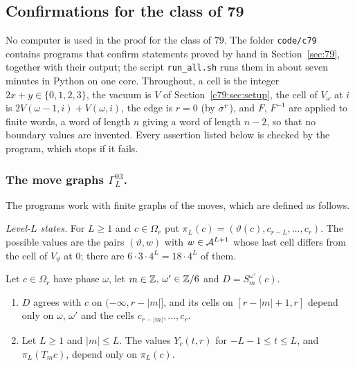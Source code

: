 \subsection{Confirmations for the class of 79}\label{app:79}

No computer is used in the proof for the class of $79$. The folder \texttt{code/c79} contains programs that confirm statements proved by hand in Section~\ref{sec:79}, together with their output; the script \texttt{run\_all.sh} runs them in about seven minutes in Python on one core. Throughout, a cell is the integer $2x+y\in\{0,1,2,3\}$, the vacuum is $V$ of Section~\ref{c79:sec:setup}, the cell of $V_\omega$ at $i$ is $2V(\omega-1,i)+V(\omega,i)$, the edge is $r=0$ (by $\sigma^r$), and $F$, $F^{-1}$ are applied to finite words, a word of length $n$ giving a word of length $n-2$, so that no boundary values are invented. Every assertion listed below is checked by the program, which stops if it fails.

\subsubsection{The move graphs $\Gamma^{93}_L$.}\label{app:79:graphs}
The programs work with finite graphs of the moves, which are defined as follows.

\emph{Level-$L$ states.} For $L\ge1$ and $c\in\Omega_r$ put $\pi_L(c)=(\vartheta(c),c_{r-L},\dots,c_r)$. The possible values are the pairs $(\vartheta,w)$ with $w\in\mathcal{A}^{L+1}$ whose last cell differs from the cell of $V_\vartheta$ at $0$; there are $6\cdot3\cdot4^{L}=18\cdot4^{L}$ of them.

\begin{lemma}[window]\label{c79:lem:window}
Let $c\in\Omega_r$ have phase $\omega$, let $m\in\mathbb{Z}$, $\omega'\in\mathbb{Z}/6$ and $D=S^{\omega'}_m(c)$.
\begin{enumerate}
\item[(a)] $D$ agrees with $c$ on $(-\infty,r-|m|]$, and its cells on $[r-|m|+1,r]$ depend only on $\omega$, $\omega'$ and the cells $c_{r-|m|},\dots,c_r$.
\item[(b)] Let $L\ge1$ and $|m|\le L$. The values $Y_c(t,r)$ for $-L-1\le t\le L$, and $\pi_L(T_mc)$, depend only on $\pi_L(c)$.
\end{enumerate}
\end{lemma}

